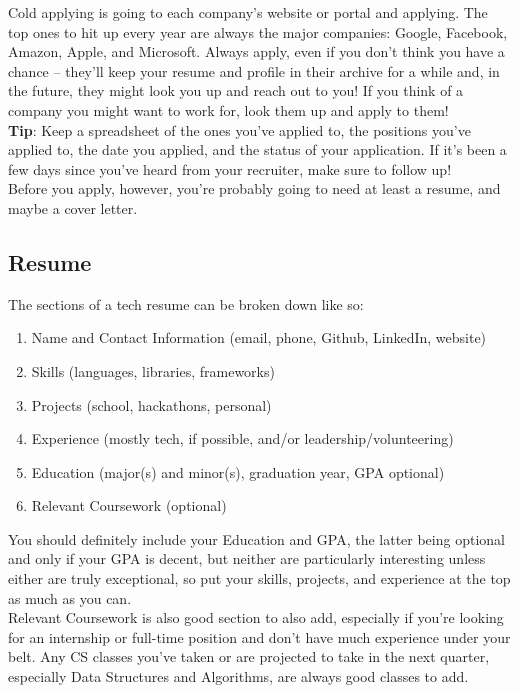\documentclass{article}
\begin{document}
Cold applying is going to each company's website or portal and applying. The top ones to hit up every year are always the major companies: Google, Facebook, Amazon, Apple, and Microsoft. Always apply, even if you don't think you have a chance -- they'll keep your resume and profile in their archive for a while and, in the future, they might look you up and reach out to you! If you think of a company you might want to work for, look them up and apply to them!\\

\textbf{Tip}: Keep a spreadsheet of the ones you've applied to, the positions you've applied to, the date you applied, and the status of your application. If it's been a few days since you've heard from your recruiter, make sure to follow up! \\

Before you apply, however, you're probably going to need at least a resume, and maybe a cover letter.
\subsection{Resume}
\label{sec:resume}
\hspace{0.5cm} The sections of a tech resume can be broken down like so: 
\begin{enumerate}
    \item Name and Contact Information (email, phone, Github, LinkedIn, website)
    \item Skills (languages, libraries, frameworks)
    \item Projects (school, hackathons, personal) 
    \item Experience (mostly tech, if possible, and/or leadership/volunteering)
    \item Education (major(s) and minor(s), graduation year, GPA optional)
    \item Relevant Coursework (optional)
\end{enumerate}

You should definitely include your Education and GPA, the latter being optional and only if your GPA is decent, but neither are particularly interesting unless either are truly exceptional, so put your skills, projects, and experience at the top as much as you can. \\

Relevant Coursework is also good section to also add, especially if you're looking for an internship or full-time position and don't have much experience under your belt. Any CS classes you've taken or are projected to take in the next quarter, especially Data Structures and Algorithms, are always good classes to add.  
\end{document}
